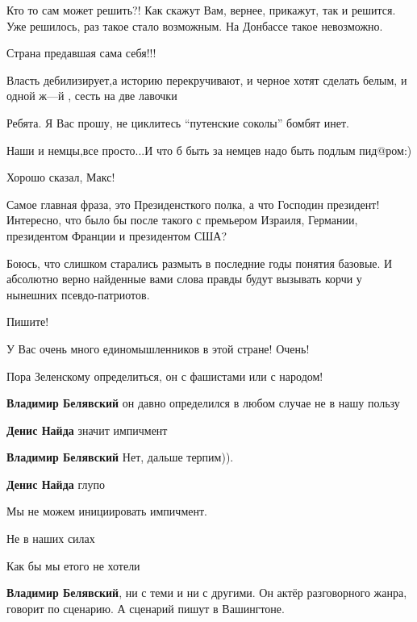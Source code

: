 \begin{itemize}
\begin{itemize}
\obeycr
Кто то сам может решить?!
Как скажут Вам, вернее, прикажут, так и решится.
Уже решилось, раз такое стало возможным.
На Донбассе такое невозможно.
\restorecr

Страна предавшая сама себя!!!

Власть дебилизирует,а историю перекручивают, и черное хотят сделать белым, и одной ж---й , сесть на две лавочки

Ребята. Я Вас прошу, не циклитесь \enquote{путенские соколы} бомбят инет.

Наши и немцы,все просто...И что б быть за немцев надо быть подлым пид@ром:)

Хорошо сказал, Макс!

Самое главная фраза, это Президенсткого полка, а что Господин президент!
Интересно, что было бы после такого с премьером Израиля, Германии,
президентом Франции и президентом США?


Боюсь, что слишком старались размыть в последние годы понятия базовые. И
абсолютно верно найденные вами слова правды будут вызывать корчи у нынешних
псевдо-патриотов.

Пишите!

У Вас очень много единомышленников в этой стране! Очень!

Пора Зеленскому определиться, он с фашистами или с народом!

\begin{itemize}
\textbf{Владимир Белявский} он давно определился в любом случае не в нашу пользу

\textbf{Денис Найда} значит импичмент

\textbf{Владимир Белявский} Нет, дальше терпим)).

\textbf{Денис Найда} глупо

Мы не можем инициировать импичмент.

Не в наших силах

Как бы мы етого не хотели

\textbf{Владимир Белявский}, ни с теми и ни с другими. Он актёр разговорного
жанра, говорит по сценарию. А сценарий пишут в Вашингтоне.
\end{itemize}


\end{itemize}
\end{itemize}
